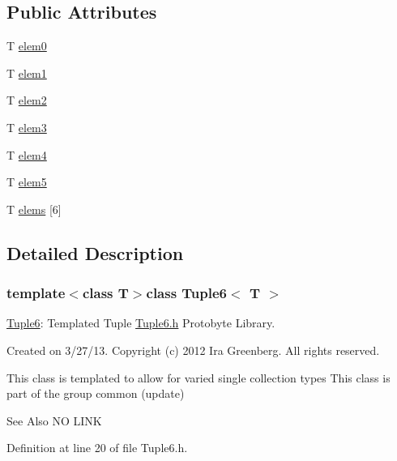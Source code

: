 \subsection*{Public Attributes}
\begin{DoxyCompactItemize}
\item 
T \hyperlink{class_tuple6_a97d05a1b12d13108263a7d4d525005fc}{elem0}
\item 
T \hyperlink{class_tuple6_a945417738c4f920052c3bca9708228ad}{elem1}
\item 
T \hyperlink{class_tuple6_a34e39006de023478d27f0ba9a701926a}{elem2}
\item 
T \hyperlink{class_tuple6_ac032ddcdf705f7f06f920fbf0687aca2}{elem3}
\item 
T \hyperlink{class_tuple6_aa2cd703b550694d8145b7d6d4db6b78a}{elem4}
\item 
T \hyperlink{class_tuple6_a6c405e93796d0a78f00def3c528036b0}{elem5}
\item 
T \hyperlink{class_tuple6_a791a67308e784978d9b235ff55b5cc69}{elems} \mbox{[}6\mbox{]}
\end{DoxyCompactItemize}


\subsection{Detailed Description}
\subsubsection*{template$<$class T$>$class Tuple6$<$ T $>$}

\hyperlink{class_tuple6}{Tuple6}\-: Templated Tuple \hyperlink{_tuple6_8h}{Tuple6.\-h} Protobyte Library. 

Created on 3/27/13. Copyright (c) 2012 Ira Greenberg. All rights reserved.

This class is templated to allow for varied single collection types This class is part of the group common (update) \begin{DoxySeeAlso}{See Also}
N\-O L\-I\-N\-K 
\end{DoxySeeAlso}


Definition at line 20 of file Tuple6.\-h.



